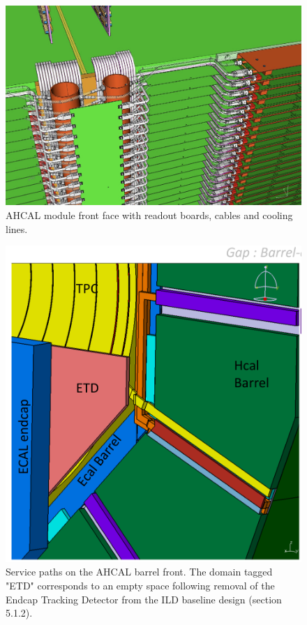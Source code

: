 \begin{figure}[h!]
    \centering
        \includegraphics[width=0.8\hsize]{Integration/fig/AHCAL_Services_Closeup.png}
    \caption{AHCAL module front face with readout boards, cables and cooling lines.}
    \label{ILD:fig:ahcal_services_closeup}
\end{figure}
\begin{figure}[h!]
    \centering
        \includegraphics[width=0.7\hsize]{Integration/fig/Barrel_Services.pdf}
    \caption{Service paths on the AHCAL barrel front. The domain tagged "ETD" corresponds to an empty space following removal of the Endcap Tracking Detector from the ILD baseline design (section 5.1.2).}
    \label{ILD:fig:barrel_services}
\end{figure}
